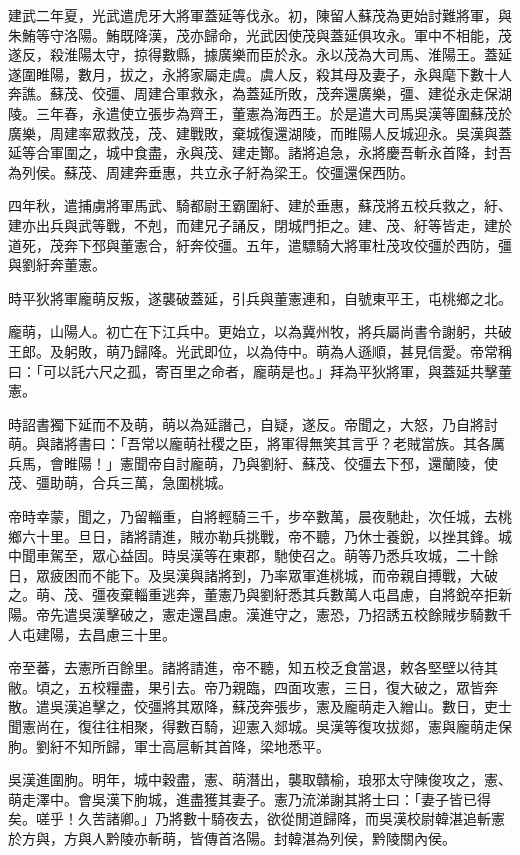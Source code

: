 \begin{pinyinscope}
建武二年夏，光武遣虎牙大將軍蓋延等伐永。初，陳留人蘇茂為更始討難將軍，與朱鮪等守洛陽。鮪既降漢，茂亦歸命，光武因使茂與蓋延俱攻永。軍中不相能，茂遂反，殺淮陽太守，掠得數縣，據廣樂而臣於永。永以茂為大司馬、淮陽王。蓋延遂圍睢陽，數月，拔之，永將家屬走虞。虞人反，殺其母及妻子，永與麾下數十人奔譙。蘇茂、佼彊、周建合軍救永，為蓋延所敗，茂奔還廣樂，彊、建從永走保湖陵。三年春，永遣使立張步為齊王，董憲為海西王。於是遣大司馬吳漢等圍蘇茂於廣樂，周建率眾救茂，茂、建戰敗，棄城復還湖陵，而睢陽人反城迎永。吳漢與蓋延等合軍圍之，城中食盡，永與茂、建走酇。諸將追急，永將慶吾斬永首降，封吾為列侯。蘇茂、周建奔垂惠，共立永子紆為梁王。佼彊還保西防。

四年秋，遣捕虜將軍馬武、騎都尉王霸圍紆、建於垂惠，蘇茂將五校兵救之，紆、建亦出兵與武等戰，不剋，而建兄子誦反，閉城門拒之。建、茂、紆等皆走，建於道死，茂奔下邳與董憲合，紆奔佼彊。五年，遣驃騎大將軍杜茂攻佼彊於西防，彊與劉紆奔董憲。

時平狄將軍龐萌反叛，遂襲破蓋延，引兵與董憲連和，自號東平王，屯桃鄉之北。

龐萌，山陽人。初亡在下江兵中。更始立，以為冀州牧，將兵屬尚書令謝躬，共破王郎。及躬敗，萌乃歸降。光武即位，以為侍中。萌為人遜順，甚見信愛。帝常稱曰：「可以託六尺之孤，寄百里之命者，龐萌是也。」拜為平狄將軍，與蓋延共擊董憲。

時詔書獨下延而不及萌，萌以為延譖己，自疑，遂反。帝聞之，大怒，乃自將討萌。與諸將書曰：「吾常以龐萌社稷之臣，將軍得無笑其言乎？老賊當族。其各厲兵馬，會睢陽！」憲聞帝自討龐萌，乃與劉紆、蘇茂、佼彊去下邳，還蘭陵，使茂、彊助萌，合兵三萬，急圍桃城。

帝時幸蒙，聞之，乃留輜重，自將輕騎三千，步卒數萬，晨夜馳赴，次任城，去桃鄉六十里。旦日，諸將請進，賊亦勒兵挑戰，帝不聽，乃休士養銳，以挫其鋒。城中聞車駕至，眾心益固。時吳漢等在東郡，馳使召之。萌等乃悉兵攻城，二十餘日，眾疲困而不能下。及吳漢與諸將到，乃率眾軍進桃城，而帝親自搏戰，大破之。萌、茂、彊夜棄輜重逃奔，董憲乃與劉紆悉其兵數萬人屯昌慮，自將銳卒拒新陽。帝先遣吳漢擊破之，憲走還昌慮。漢進守之，憲恐，乃招誘五校餘賊步騎數千人屯建陽，去昌慮三十里。

帝至蕃，去憲所百餘里。諸將請進，帝不聽，知五校乏食當退，敕各堅壁以待其敝。頃之，五校糧盡，果引去。帝乃親臨，四面攻憲，三日，復大破之，眾皆奔散。遣吳漢追擊之，佼彊將其眾降，蘇茂奔張步，憲及龐萌走入繒山。數日，吏士聞憲尚在，復往往相聚，得數百騎，迎憲入郯城。吳漢等復攻拔郯，憲與龐萌走保朐。劉紆不知所歸，軍士高扈斬其首降，梁地悉平。

吳漢進圍朐。明年，城中穀盡，憲、萌潛出，襲取贛榆，琅邪太守陳俊攻之，憲、萌走澤中。會吳漢下朐城，進盡獲其妻子。憲乃流涕謝其將士曰：「妻子皆已得矣。嗟乎！久苦諸卿。」乃將數十騎夜去，欲從閒道歸降，而吳漢校尉韓湛追斬憲於方與，方與人黔陵亦斬萌，皆傳首洛陽。封韓湛為列侯，黔陵關內侯。


\end{pinyinscope}
